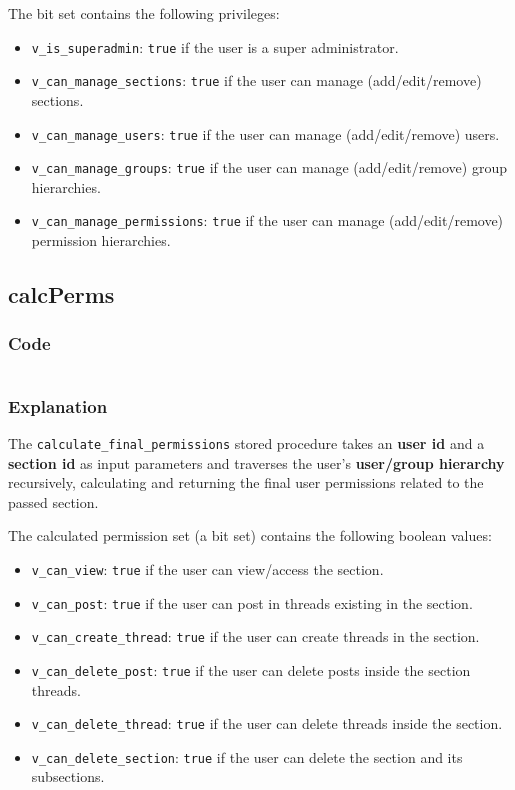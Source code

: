 \documentclass[12pt]{report}
\renewcommand\emph{\textbf}
\newcommand{\printSQLtest}[1]
{
    \inputminted[linenos, breaklines, breakbytoken, tabsize=4, fontsize=\footnotesize]{mysql}{#1}
}
\newcommand{\printSQLTablepage}[2]
{
    \newpage
    \subsection{#2}
    \subsubsection{Code}
    \printSQLtest{../sql/parts/#1}
    \subsubsection{Explanation}
}
\begin{document}
                    The bit set contains the following privileges:

                    \begin{itemize}
                        \item \texttt{v_is_superadmin}: \texttt{true} if the user is a super administrator.
                        \item \texttt{v_can_manage_sections}: \texttt{true} if the user can manage (add/edit/remove) sections.
                        \item \texttt{v_can_manage_users}: \texttt{true} if the user can manage (add/edit/remove) users.
                        \item \texttt{v_can_manage_groups}: \texttt{true} if the user can manage (add/edit/remove) group hierarchies.
                        \item \texttt{v_can_manage_permissions}: \texttt{true} if the user can manage (add/edit/remove) permission hierarchies.
                    \end{itemize}


                \printSQLTablepage{29_procCalcPerms.sql}{calcPerms}
                    The \texttt{calculate_final_permissions} stored procedure takes an \emph{user id} and a \emph{section id} as input parameters and traverses the user's \emph{user/group hierarchy} recursively, calculating and returning the final user permissions related to the passed section.

                    The calculated permission set (a bit set) contains the following boolean values:

                    \begin{itemize}
                        \item \texttt{v_can_view}: \texttt{true} if the user can view/access the section.
                        \item \texttt{v_can_post}: \texttt{true} if the user can post in threads existing in the section.
                        \item \texttt{v_can_create_thread}: \texttt{true} if the user can create threads in the section.
                        \item \texttt{v_can_delete_post}: \texttt{true} if the user can delete posts inside the section threads.
                        \item \texttt{v_can_delete_thread}: \texttt{true} if the user can delete threads inside the section.
                        \item \texttt{v_can_delete_section}: \texttt{true} if the user can delete the section and its subsections.
                    \end{itemize}
\end{document}
